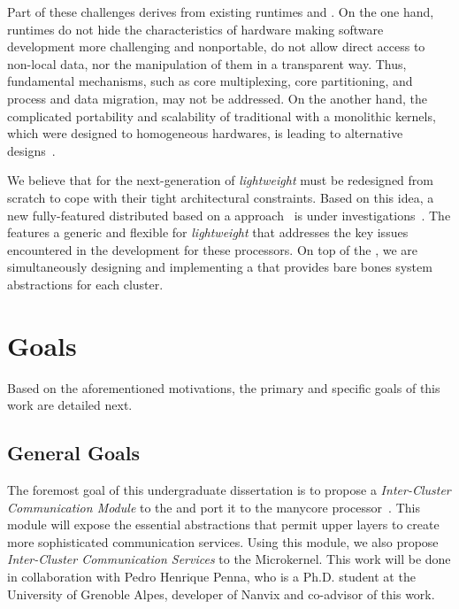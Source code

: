 	Part of these challenges derives from existing runtimes and \oss.
	On the one hand, runtimes do not hide the characteristics of hardware making
	software development more challenging and nonportable, \eg do not allow
	direct access to non-local data, nor the manipulation of them in a transparent way.
	Thus, fundamental \os mechanisms, such as core multiplexing, core partitioning,
	and process and data migration, may not be addressed.
	On the another hand, the complicated portability and scalability of traditional \oss with a
	monolithic kernels, which were designed to homogeneous hardwares, is leading to alternative
	\os designs~\cite{Baumann2009, kluge2014, nightingale2009, rhoden2011}.

	We believe that \oss for the next-generation of \textit{lightweight} \manycores must be
	redesigned from scratch to cope with their tight architectural constraints.
	Based on this idea, a new fully-featured distributed \os based on a \multikernel approach~\cite{Baumann2009}
	is under investigations~\cite{penna2017-1,penna2017-2,penna2019}.
	The \nanvix \multikernel features a generic and flexible \hal for \textit{lightweight} \manycores that
	addresses the key issues encountered in the development for these processors.
	On top of the \nanvix \hal, we are simultaneously designing and implementing a \microkernel
	that provides bare bones system abstractions for each cluster.

\section{Goals}
\label{sec.goals}

	Based on the aforementioned motivations, the primary and specific goals of this work are detailed next.

\subsection{General Goals}
\label{sec.goals.general}

	The foremost goal of this undergraduate dissertation is to propose a \textit{Inter-Cluster Communication Module}
	to the \nanvix \hal and port it to the \mppa manycore processor~\cite{DeDinechin2013-1}.
	This module will expose the essential abstractions that permit upper layers to create more
	sophisticated communication services.
	Using this module, we also propose \textit{Inter-Cluster Communication Services} to the \nanvix Microkernel.
	This work will be done in collaboration with Pedro Henrique Penna, who is a Ph.D. student at the
	University of Grenoble Alpes, developer of Nanvix and co-advisor of this work.


